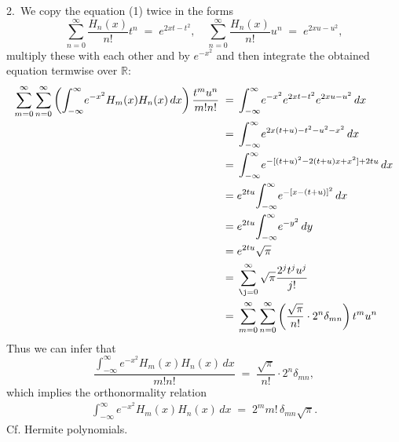 \documentclass[12pt]{article}
\theoremstyle{definition}
\begin{document}
2.\, We copy the equation (1) twice in the forms
$$\sum_{n=0}^\infty\frac{H_n(x)}{n!}t^n \;=\; e^{2xt-t^2}, \quad 
  \sum_{n=0}^\infty\frac{H_n(x)}{n!}u^n \;=\; e^{2xu-u^2},$$
multiply these with each other and by $e^{-x^2}$ and then integrate the obtained equation termwise over 
$\mathbb{R}$:
\begin{align*}
\sum_{m=0}^\infty\sum_{n=0}^\infty\left(\int_{-\infty}^\infty\!e^{-x^2}H_m(x)H_n(x)\,dx\right)\frac{t^mu^n}{m!n!} 
\;=\; & \int_{-\infty}^\infty\!e^{-x^2}e^{2xt-t^2}e^{2xu-u^2}\,dx \\
\;=\; & \int_{-\infty}^\infty\!e^{2x(t+u)-t^2-u^2-x^2}\,dx \\
\;=\; & \int_{-\infty}^\infty\!e^{-[(t+u)^2-2(t+u)x+x^2]+2tu}\,dx \\
\;=\; & e^{2tu}\!\int_{-\infty}^\infty\!e^{-[x-(t+u)]^2}\,dx \\
\;=\; & e^{2tu}\!\int_{-\infty}^\infty\!e^{-y^2}\,dy \\
\;=\; & e^{2tu}\sqrt{\pi} \\
\;=\; & \sum_{\j=0}^\infty\sqrt{\pi}\frac{2^jt^ju^j}{j!} \\
\;=\; & \sum_{m=0}^\infty\sum_{n=0}^\infty\left(\frac{\sqrt{\pi}}{n!}\cdot2^n\delta_{mn}\right)t^mu^n
\end{align*}
Thus we can infer that
$$\frac{\int_{-\infty}^\infty\!e^{-x^2}H_m(x)H_n(x)\,dx}{m!n!} \;=\; \frac{\sqrt{\pi}}{n!}\cdot2^n\delta_{mn},$$
which implies the orthonormality relation
\begin{align}
\int_{-\infty}^\infty\!e^{-x^2}H_m(x)H_n(x)\,dx \;=\; 2^mm!\,\delta_{mn}\sqrt{\pi}.
\end{align}
Cf. Hermite polynomials.

\end{document}
